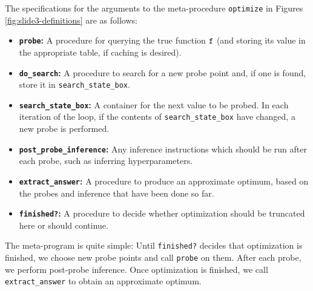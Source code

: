 The specifications for the arguments to the meta-procedure \texttt{optimize} in
Figures \ref{fig:slide3-definitions} are as
follows:
\newcommand{\itmh}[1]{\textbf{\texttt{#1}:}}
\begin{itemize}
  \item \itmh{probe}
    A procedure for querying the true function $\texttt{f}$ (and storing its
    value in the appropriate table, if caching is desired).
  \item \itmh{do\_search}
    A procedure to search for a new probe point and, if one is found, store it
    in \texttt{search\_state\_box}.
  \item \itmh{search\_state\_box}
    A container for the next value to be probed.  In each iteration of the loop,
    if the contents of \texttt{search\_state\_box} have changed, a new probe is
    performed.
  \item \itmh{post\_probe\_inference}
    Any inference instructions which should be run after each probe, such
    as inferring hyperparameters.
  \item \itmh{extract\_answer}
    A procedure to produce an approximate optimum, based on the probes and
    inference that have been done so far.
  \item \itmh{finished?}
    A procedure to decide whether optimization should be truncated here or
    should continue.
\end{itemize}
The meta-program is quite simple: Until \texttt{finished?} decides that
optimization is finished, we choose new probe points and call
\texttt{probe} on them.  After each probe, we perform post-probe inference.
Once optimization is finished, we call \texttt{extract\_answer} to obtain
an approximate optimum.
